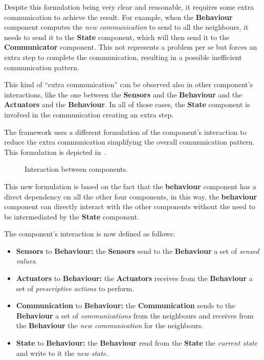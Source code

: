 
Despite this formulation being very clear and reasonable, it requires some extra communication to achieve the result.
For example, when the \textbf{Behaviour} component computes the \textit{new communication} to send to all the neighbours, it needs to send it to the
\textbf{State} component, which will then send it to the \textbf{Communicator} component. This not represents a problem per se but forces an extra
step to complete the communication, resulting in a possible inefficient communication pattern.

This kind of ``extra communication'' can be observed also in other component's interactions, like the one between the \textbf{Sensors} and the
\textbf{Behaviour} and the \textbf{Actuators} and the \textbf{Behaviour}. In all of those cases, the \textbf{State} component is involved in the
communication creating an extra step.

The framework uses a different formulation of the component's interaction to reduce the extra communication simplifying the overall communication
pattern. This formulation is depicted in~.

\begin{figure}
	\centering
	\caption{Interaction between components.}
	\label{fig:framework-components-interaction-2}
\end{figure}

This new formulation is based on the fact that the \textbf{behaviour} component has a direct dependency on all the other four components,
in this way, the \textbf{behaviour} component can directly interact with the other components without the need to be intermediated by the
\textbf{State} component.

The component's interaction is now defined as follows:
\begin{itemize}
	\item \textbf{Sensors} to \textbf{Behaviour:} the \textbf{Sensors} send to the \textbf{Behaviour} a set of \textit{sensed values}.
	\item \textbf{Actuators} to \textbf{Behaviour:} the \textbf{Actuators} receives from the \textbf{Behaviour} a set of \textit{prescriptive
		      actions} to perform.
	\item \textbf{Communication} to \textbf{Behaviour:} the \textbf{Communication} sends to the \textbf{Behaviour} a set of \textit{communications}
	      from the neighbours and receives from the \textbf{Behaviour} the \textit{new communication} for the neighbours.
	      \item\textbf{State} to \textbf{Behaviour:} the \textbf{Behaviour} read from the \textbf{State} the \textit{current state} and write to it
	      the \textit{new state}.
\end{itemize}

